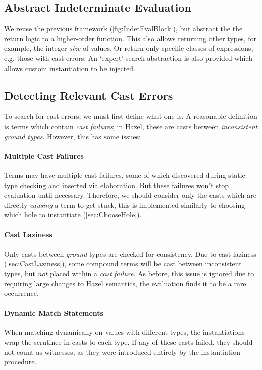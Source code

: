 \subsection{Abstract Indeterminate Evaluation}
\label{sec:AbstractSearch}
We reuse the previous framework (\cref{fig:IndetEvalBlock}), but abstract the the return logic to a higher-order  function. This also allows returning other types, for example, the integer \textit{size} of values. Or return only specific classes of expressions, e.g. those with cast errors. An `expert' search abstraction is also provided which allows custom instantiation to be injected.

\subsection{Detecting Relevant Cast Errors}
\label{sec:CastFailureDetection}
To search for cast errors, we must first define what one is. A reasonable definition is terms which contain \textit{cast failures}; in Hazel, these are casts between \textit{inconsistent ground types}. However, this has some issues:

\paragraph{Multiple Cast Failures} Terms may have multiple cast failures, some of which discovered during static type checking and inserted via elaboration. But these failures won't stop evaluation until necessary. Therefore, we should consider only the casts which are directly \textit{causing} a term to get stuck, this is implemented similarly to choosing which hole to instantiate (\cref{sec:ChooseHole}).

\paragraph{Cast Laziness}
\label{sec:SearchCastLaziness}
Only casts between \textit{ground} types are checked for consistency. Due to cast laziness (\cref{sec:CastLaziness}), some compound terms will be cast between inconsistent types, but \textit{not} placed within a \textit{cast failure}. As before, this issue is ignored due to requiring large changes to Hazel semantics, the evaluation finds it to be a rare occurrence.

\paragraph{Dynamic Match Statements} When matching dynamically on values with different types, the instantiations wrap the scrutinee in casts to each type. If any of these casts failed, they should not count as witnesses, as they were introduced entirely by the instantiation procedure. 

